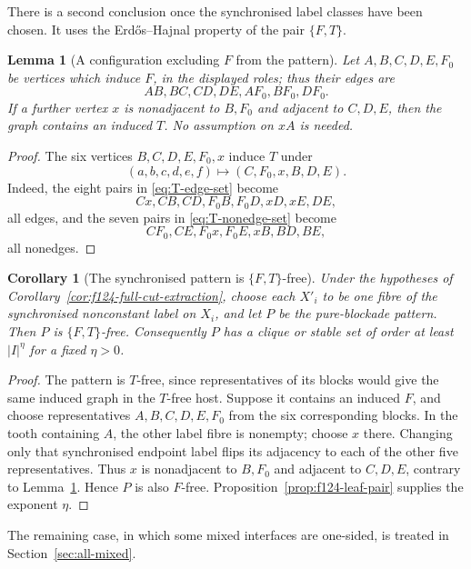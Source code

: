 \documentclass[11pt]{article}
\numberwithin{equation}{section}
\theoremstyle{plain}
\newtheorem{lemma}[theorem]{Lemma}
\newtheorem{corollary}[theorem]{Corollary}
\theoremstyle{definition}
\begin{document}
There is a second conclusion once the synchronised label classes have been
chosen.  It uses the Erd\H{o}s--Hajnal property of the pair $\{F,T\}$.

\begin{lemma}[A configuration excluding $F$ from the pattern]
\label{lem:f124-antitwin-quotient}
Let $A,B,C,D,E,F_0$ be vertices which induce $F$, in the displayed
roles; thus their edges are
\[
 AB,BC,CD,DE,AF_0,BF_0,DF_0.
\]
If a further vertex $x$ is nonadjacent to $B,F_0$ and adjacent to
$C,D,E$, then the graph
contains an induced $T$.  No assumption on $xA$ is needed.
\end{lemma}

\begin{proof}
The six vertices $B,C,D,E,F_0,x$ induce $T$ under
\begin{equation*}
 (a,b,c,d,e,f)\longmapsto(C,F_0,x,B,D,E).
\end{equation*}
Indeed, the eight pairs in \eqref{eq:T-edge-set} become
\[
 Cx,CB,CD,F_0B,F_0D,xD,xE,DE,
\]
all edges, and the seven pairs in \eqref{eq:T-nonedge-set} become
\[
 CF_0,CE,F_0x,F_0E,xB,BD,BE,
\]
all nonedges.
\end{proof}

\begin{corollary}[The synchronised pattern is $\{F,T\}$-free]
\label{cor:f124-sync-quotient-pairfree}
Under the hypotheses of Corollary~\ref{cor:f124-full-cut-extraction}, choose
each $X'_i$ to be one fibre of the synchronised nonconstant label on
$X_i$, and let $P$ be the pure-blockade pattern.  Then $P$ is
$\{F,T\}$-free.  Consequently $P$ has a clique or stable set of order at
least $|I|^\eta$ for a fixed $\eta>0$.
\end{corollary}

\begin{proof}
The pattern is $T$-free, since representatives of its blocks would give
the same induced graph in the $T$-free host.  Suppose it contains an
induced $F$, and choose representatives
$A,B,C,D,E,F_0$ from the six corresponding blocks.  In the tooth
containing $A$, the other label fibre is nonempty; choose $x$ there.
Changing only that synchronised endpoint label flips its adjacency to
each of the other five representatives.  Thus $x$ is nonadjacent to
$B,F_0$ and adjacent to $C,D,E$, contrary to
Lemma~\ref{lem:f124-antitwin-quotient}.  Hence $P$ is also $F$-free.
Proposition~\ref{prop:f124-leaf-pair} supplies the exponent $\eta$.
\end{proof}

The remaining case, in which some mixed interfaces are one-sided, is
treated in Section~\ref{sec:all-mixed}.
\end{document}
